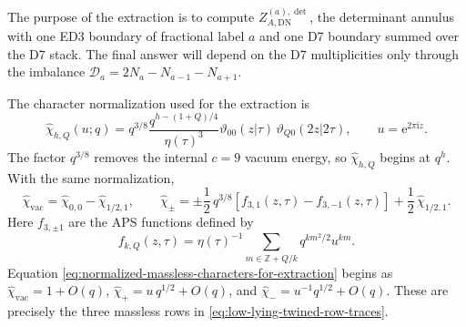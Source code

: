 \documentclass[11pt]{article}
\newcommand{\Z}{\mathbb{Z}}
\newcommand{\vac}{\mathrm{vac}}
\newcommand{\DN}{\mathrm{DN}}
\newcommand{\ii}{\mathrm{i}}
\newcommand{\e}{\mathrm{e}}
\newcommand{\vart}{\vartheta}
\begin{document}
The purpose of the extraction is to compute \(Z_{A,\DN}^{(a),\det}\), the determinant annulus
with one ED3 boundary of fractional label \(a\) and one D7 boundary summed over the D7 stack.
The final answer will depend on the D7 multiplicities only through the imbalance
\(\mathcal D_a=2N_a-N_{a-1}-N_{a+1}\).

The character normalization used for the extraction is
\begin{equation}
  \widehat\chi_{h,Q}(u;q)
  =
  q^{3/8}
  \frac{q^{h-(1+Q)/4}}{\eta(\tau)^3}
  \vart_{00}(z|\tau)\,\vart_{Q0}(2z|2\tau),
  \qquad
  u=\e^{2\pi\ii z}.
  \label{eq:normalized-massive-character-for-extraction}
\end{equation}
The factor \(q^{3/8}\) removes the internal \(c=9\) vacuum energy, so
\(\widehat\chi_{h,Q}\) begins at \(q^h\). With the same normalization,
\begin{equation}
  \widehat\chi_{\vac}
  =
  \widehat\chi_{0,0}-\widehat\chi_{1/2,1},
  \qquad
  \widehat\chi_{\pm}
  =
  \pm\frac12\,q^{3/8}\!\left[f_{3,1}(z,\tau)-f_{3,-1}(z,\tau)\right]
  +
  \frac12\,\widehat\chi_{1/2,1}.
  \label{eq:normalized-massless-characters-for-extraction}
\end{equation}
Here \(f_{3,\pm1}\) are the APS functions defined by
\[
  f_{k,Q}(z,\tau)=\eta(\tau)^{-1}
  \sum_{m\in\Z+Q/k}q^{k m^2/2}u^{km}.
\]
Equation \eqref{eq:normalized-massless-characters-for-extraction} begins as
\(\widehat\chi_{\vac}=1+O(q)\),
\(\widehat\chi_{+}=u\,q^{1/2}+O(q)\), and
\(\widehat\chi_{-}=u^{-1}q^{1/2}+O(q)\). These are precisely the three massless rows in
\eqref{eq:low-lying-twined-row-traces}.
\end{document}
